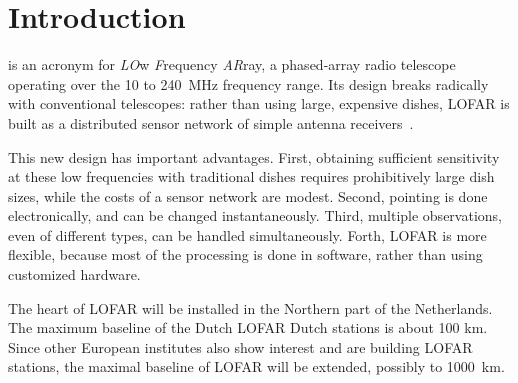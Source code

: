 \documentclass[journal]{IEEEtran}
\begin{document}
\section{Introduction}
% 
% 
% 
% 

 is an acronym for {\em LO\/}w {\em F\/}requency
{\em AR\/}ray, a phased-array radio telescope operating over the 10 to
240~MHz frequency range.
Its design breaks radically with conventional telescopes:
rather than using large, expensive dishes, LOFAR is built as a distributed
sensor network of simple antenna receivers~\cite{Butcher:04}.

This new design has important advantages.
First, obtaining sufficient sensitivity at these low frequencies with
traditional dishes requires prohibitively large dish sizes, while the costs
of a sensor network are modest.
Second, pointing is done electronically, and can be changed instantaneously.
Third, multiple observations, even of different types, can be handled
simultaneously.
Forth, LOFAR is more flexible, because most of the processing is done in
software, rather than using customized hardware.

The heart of LOFAR will be installed in the Northern part of the Netherlands.
The maximum baseline of the Dutch LOFAR Dutch stations is about 100 km.
Since other European institutes also show interest and are building LOFAR
stations, the maximal baseline of LOFAR will be extended, possibly to 1000~km.  
\end{document}
